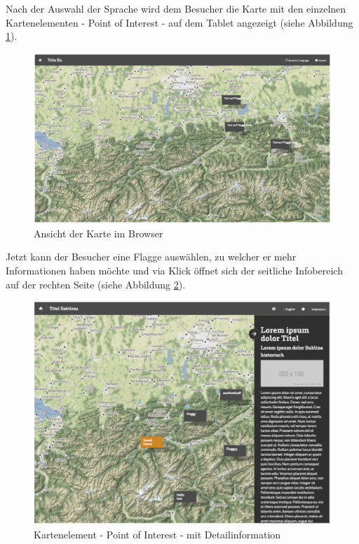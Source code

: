 Nach der Auswahl der Sprache wird dem Besucher die Karte mit den einzelnen Kartenelementen - Point of Interest - auf dem Tablet angezeigt (siehe Abbildung \ref{img:karte_browser}).

\begin{figure}[ht!]
\centering
\includegraphics[width=12cm]{Figures/paula/karte/karte_browser.png}
\caption{Ansicht der Karte im Browser}
\label{img:karte_browser}
\end{figure}

Jetzt kann der Besucher eine Flagge auswählen, zu welcher er mehr Informationen haben möchte und via Klick öffnet sich der seitliche Infobereich auf der rechten Seite (siehe Abbildung \ref{img:kartenelement_detail}).

\begin{figure}[ht!]
\centering
\includegraphics[width=12cm]{Figures/paula/karte/kartenelement_detail.png}
\caption{Kartenelement - Point of Interest - mit Detailinformation}
\label{img:kartenelement_detail}
\end{figure}

